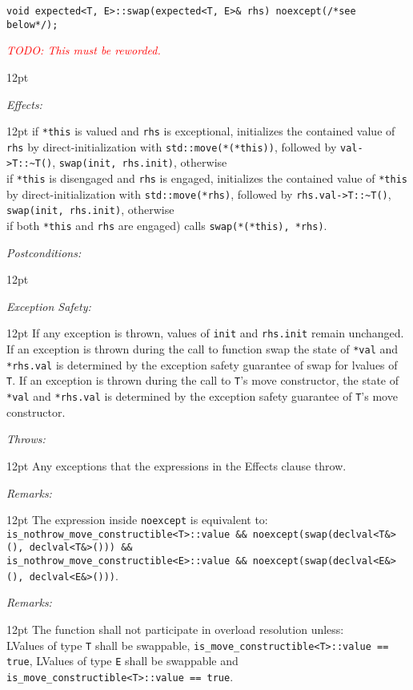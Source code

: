 \documentclass[a4paper,10pt]{article}
\newcommand{\cpp}[1]{\lstinline{#1}}
\newcommand{\todo}[1]{\emph{\textcolor{red}{TODO: #1}}}
\newcommand{\wordingItem}[1]{\noindent\textit{#1:}}
\newenvironment{wordingTextItem}[1]{\wordingItem{#1}\vspace{7pt}\noindent\begin{adjustwidth}{12pt}{}}{\vspace{7pt}\end{adjustwidth}}
\newenvironment{wordingPara}{\begin{adjustwidth}{12pt}{}}{\end{adjustwidth}}
\begin{document}
\begin{lstlisting}[xleftmargin=0pt]
void expected<T, E>::swap(expected<T, E>& rhs) noexcept(/*see below*/); 
\end{lstlisting}
\todo{This must be reworded.}
\begin{wordingPara}


\begin{wordingTextItem}{Effects}
if \cpp{*this} is valued and \cpp{rhs} is exceptional, initializes the contained value of \cpp{rhs} by direct-initialization with \cpp{std::move(*(*this))}, followed by \cpp{val->T::~T()}, \cpp{swap(init, rhs.init)}, otherwise \\
if \cpp{*this} is disengaged and \cpp{rhs} is engaged, initializes the contained value of \cpp{*this} by direct-initialization with \cpp{std::move(*rhs)}, followed by \cpp{rhs.val->T::~T()}, \cpp{swap(init, rhs.init)}, otherwise \\
if both \cpp{*this} and \cpp{rhs} are engaged) calls \cpp{swap(*(*this), *rhs)}. 
\end{wordingTextItem}
\begin{wordingTextItem}{Postconditions}
\end{wordingTextItem}
\begin{wordingTextItem}{Exception Safety}
If any exception is thrown, values of \cpp{init} and \cpp{rhs.init} remain unchanged. If an exception is thrown during the call to function swap the state of \cpp{*val} and \cpp{*rhs.val} is determined by the exception safety guarantee of swap for lvalues of \cpp{T}. If an exception is thrown during the call to \cpp{T}'s move constructor, the state of \cpp{*val} and \cpp{*rhs.val} is determined by the exception safety guarantee of \cpp{T}'s move constructor.
\end{wordingTextItem}
\begin{wordingTextItem}{Throws}
Any exceptions that the expressions in the Effects clause throw.
\end{wordingTextItem}
\begin{wordingTextItem}{Remarks}
The expression inside \cpp{noexcept} is equivalent to: \\
\cpp{is_nothrow_move_constructible<T>::value && noexcept(swap(declval<T&>(), declval<T&>())) &&} \\
\cpp{is_nothrow_move_constructible<E>::value && noexcept(swap(declval<E&>(), declval<E&>()))}.
\end{wordingTextItem}
\begin{wordingTextItem}{Remarks}
The function shall not participate in overload resolution unless: \\
LValues of type \cpp{T} shall be swappable, \cpp{is_move_constructible<T>::value == true}, LValues of type \cpp{E} shall be swappable and \cpp{is_move_constructible<T>::value == true}.
\end{wordingTextItem}
\end{wordingPara}
\end{document}
